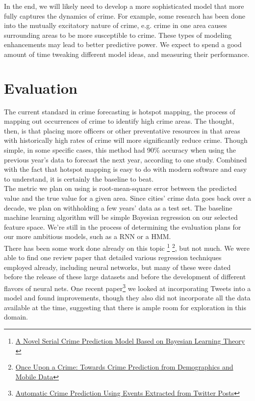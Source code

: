 \documentclass[10pt]{article}
\begin{document}
	In the end, we will likely need to develop a more sophisticated model that more fully captures the dynamics of crime. For example, some research has been done into the mutually excitatory nature of crime, e.g. crime in one area causes surrounding areas to be more susceptible to crime. These types of modeling enhancements may lead to better predictive power. We expect to spend a good amount of time tweaking different model ideas, and measuring their performance.

\section{Evaluation}
	The current standard in crime forecasting is hotspot mapping, the process of mapping out occurrences of crime to identify high crime areas. The thought, then, is that placing more officers or other preventative resources in that areas with historically high rates of crime will more significantly reduce crime. Though simple, in some specific cases, this method had 90\% accuracy when using the previous year's data to forecast the next year, according to one study. Combined with the fact that hotspot mapping is easy to do with modern software and easy to understand, it is certainly the baseline to beat. \\
	
	The metric we plan on using is root-mean-square error between the predicted value and the true value for a given area. Since cities' crime data goes back over a decade, we plan on withholding a few years' data as a test set. The baseline machine learning algorithm will be simple Bayesian regression on our selected feature space. We're still in the process of determining the evaluation plans for our more ambitious models, such as a RNN or a HMM.\\
	
	There has been some work done already on this topic \footnote{\href{http://ieeexplore.ieee.org.ezp-prod1.hul.harvard.edu/stamp/stamp.jsp?tp=&arnumber=5580971}{A Novel Serial Crime Prediction Model Based on Bayesian Learning Theory }} \footnote{\href{http://delivery.acm.org.ezp-prod1.hul.harvard.edu/10.1145/2670000/2663254/p427-bogomolov.pdf?ip=128.103.149.52&id=2663254&acc=ACTIVE\%20SERVICE&key=C82FBC3DCC335AD2\%2E4D4702B0C3E38B35\%2E4D4702B0C3E38B35\%2E4D4702B0C3E38B35&CFID=553305163&CFTOKEN=20331583&__acm__=1444871399_feb25f6bb65f577ea58bb1f29f2f176a}{Once Upon a Crime: Towards Crime Prediction from
Demographics and Mobile Data}}, but not much. We were able to find one review paper that detailed various regression techniques employed already, including neural networks, but many of these were dated before the release of these large datasets and before the development of different flavors of neural nets. One recent paper\footnote{\href{http://link.springer.com/chapter/10.1007/978-3-642-29047-3_28}{Automatic Crime Prediction Using Events Extracted from Twitter Posts}} we looked at incorporating Tweets into a model and found improvements, though they also did not incorporate all the data available at the time, suggesting that there is ample room for exploration in this domain.
\end{document}

